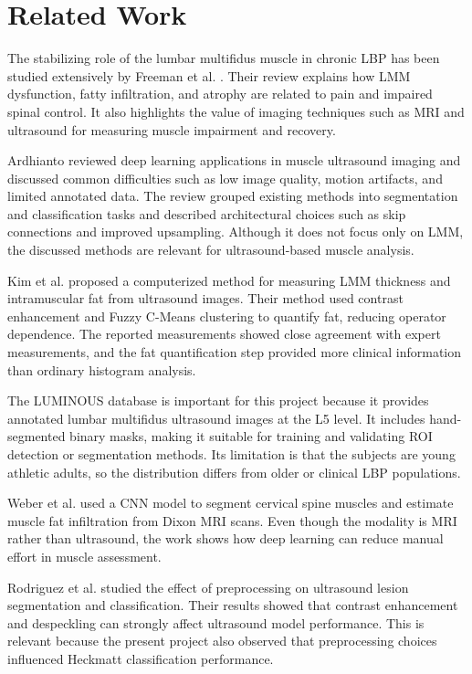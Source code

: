 \documentclass[twocolumn,10pt]{article}
\begin{document}
\section{Related Work}
\label{relatedwork}
The stabilizing role of the lumbar multifidus muscle in chronic LBP has been studied extensively by Freeman et al. \cite{Freeman2010}. Their review explains how LMM dysfunction, fatty infiltration, and atrophy are related to pain and impaired spinal control. It also highlights the value of imaging techniques such as MRI and ultrasound for measuring muscle impairment and recovery.

Ardhianto \cite{DeepLearningChallenges2021} reviewed deep learning applications in muscle ultrasound imaging and discussed common difficulties such as low image quality, motion artifacts, and limited annotated data. The review grouped existing methods into segmentation and classification tasks and described architectural choices such as skip connections and improved upsampling. Although it does not focus only on LMM, the discussed methods are relevant for ultrasound-based muscle analysis.

Kim et al. \cite{Kim2020} proposed a computerized method for measuring LMM thickness and intramuscular fat from ultrasound images. Their method used contrast enhancement and Fuzzy C-Means clustering to quantify fat, reducing operator dependence. The reported measurements showed close agreement with expert measurements, and the fat quantification step provided more clinical information than ordinary histogram analysis.

The LUMINOUS database \cite{Belasso2020} is important for this project because it provides annotated lumbar multifidus ultrasound images at the L5 level. It includes hand-segmented binary masks, making it suitable for training and validating ROI detection or segmentation methods. Its limitation is that the subjects are young athletic adults, so the distribution differs from older or clinical LBP populations.

Weber et al. \cite{Weber2021} used a CNN model to segment cervical spine muscles and estimate muscle fat infiltration from Dixon MRI scans. Even though the modality is MRI rather than ultrasound, the work shows how deep learning can reduce manual effort in muscle assessment.

Rodriguez et al. \cite{Rodriguez2017} studied the effect of preprocessing on ultrasound lesion segmentation and classification. Their results showed that contrast enhancement and despeckling can strongly affect ultrasound model performance. This is relevant because the present project also observed that preprocessing choices influenced Heckmatt classification performance.
\end{document}
